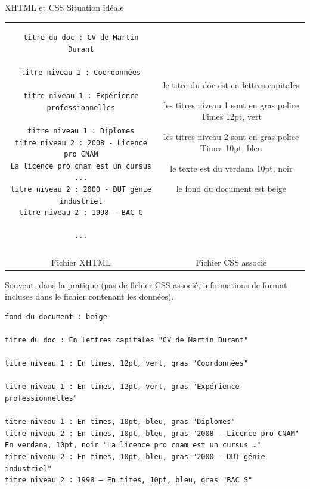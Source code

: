 \begin{frame}{XHTML et CSS}
Situation id\'eale

\bigskip
\bigskip
\bigskip

\begin{tabular}{cc}
\begin{minipage}{0.5\textwidth}
\begin{tiny}
\begin{verbatim}
titre du doc : CV de Martin Durant

titre niveau 1 : Coordonnées

titre niveau 1 : Expérience professionnelles

titre niveau 1 : Diplomes
titre niveau 2 : 2008 - Licence pro CNAM
La licence pro cnam est un cursus ...
titre niveau 2 : 2000 - DUT génie industriel
titre niveau 2 : 1998 - BAC C

...
\end{verbatim}
\end{tiny}
\end{minipage}
&
\begin{minipage}{0.3\textwidth}
\begin{footnotesize}
le titre du doc est en lettres capitales

les titres niveau 1 sont en gras police Times 12pt, vert

les titres niveau 2 sont en gras police Times 10pt, bleu

le texte est du verdana 10pt, noir

le fond du document est beige
\end{footnotesize}
\end{minipage}\\
\\
Fichier XHTML & Fichier CSS associ\'e\\
\end{tabular}


\framebreak

Souvent, dans la pratique (pas de fichier CSS associ\'e, informations de format incluses dans le fichier contenant les donn\'ees).

\begin{small}
\begin{verbatim}
fond du document : beige

titre du doc : En lettres capitales "CV de Martin Durant"

titre niveau 1 : En times, 12pt, vert, gras "Coordonnées"

titre niveau 1 : En times, 12pt, vert, gras "Expérience professionnelles"

titre niveau 1 : En times, 10pt, bleu, gras "Diplomes"
titre niveau 2 : En times, 10pt, bleu, gras "2008 - Licence pro CNAM"
En verdana, 10pt, noir "La licence pro cnam est un cursus …"
titre niveau 2 : En times, 10pt, bleu, gras "2000 - DUT génie industriel"
titre niveau 2 : 1998 – En times, 10pt, bleu, gras "BAC S"
\end{verbatim}
\end{small}

\end{frame}



